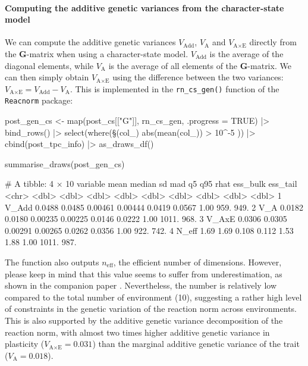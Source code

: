 \documentclass[a4paper,12pt,twoside]{article}
\begin{document}
\paragraph{Computing the additive genetic variances from the character-state model}
We can compute the additive genetic variances $V_{\text{Add}}$, $V_{\text{A}}$ and $V_{\text{A}\times\text{E}}$ directly from the $\mathbf{G}$-matrix when using a character-state model.
$V_{\text{Add}}$ is the average of the diagonal elements, while $V_{\text{A}}$ is the average of all elements of the $\mathbf{G}$-matrix.
We can then simply obtain $V_{\text{A}\times\text{E}}$ using the difference between the two variances: $V_{\text{A}\times\text{E}} = V_{\text{Add}} - V_{\text{A}}$.
This is implemented in the \texttt{rn\_cs\_gen()} function of the \texttt{Reacnorm} package:
\begin{Rinput}
post_gen_cs <-
    map(post_cs[["G"]], rn_cs_gen, .progress = TRUE) |>
    bind_rows()  |>
    select(where(\§§(col_) { abs(mean(col_)) > 10^-5 })) |>
    cbind(post_tpc_info) |>
    as_draws_df()

summarise_draws(post_gen_cs)
\end{Rinput}
\begin{Routput}
# A tibble: 4 × 10
  variable   mean median      sd     mad     q5    q95  rhat ess_bulk ess_tail
  <chr>     <dbl>  <dbl>   <dbl>   <dbl>  <dbl>  <dbl> <dbl>    <dbl>    <dbl>
1 V_Add    0.0488 0.0485 0.00461 0.00444 0.0419 0.0567  1.00     959.     949.
2 V_A      0.0182 0.0180 0.00235 0.00225 0.0146 0.0222  1.00    1011.     968.
3 V_AxE    0.0306 0.0305 0.00291 0.00265 0.0262 0.0356  1.00     922.     742.
4 N_eff    1.69   1.69   0.108   0.112   1.53   1.88    1.00    1011.     987.
\end{Routput}
The function also outputs $n_{\text{eff}}$, the efficient number of dimensions.
However, please keep in mind that this value seems to suffer from underestimation, as shown in the companion paper \autocite{devillemereuil_general_2016}.
Nevertheless, the number is relatively low compared to the total number of environment (10), suggesting a rather high level of constraints in the genetic variation of the reaction norm across environments.
This is also supported by the additive genetic variance decomposition of the reaction norm, with almost two times higher additive genetic variance in plasticity ($V_{\text{A}\times\text{E}} = 0.031$) than the marginal additive genetic variance of the trait ($V_{\text{A}} = 0.018$).
\end{document}
